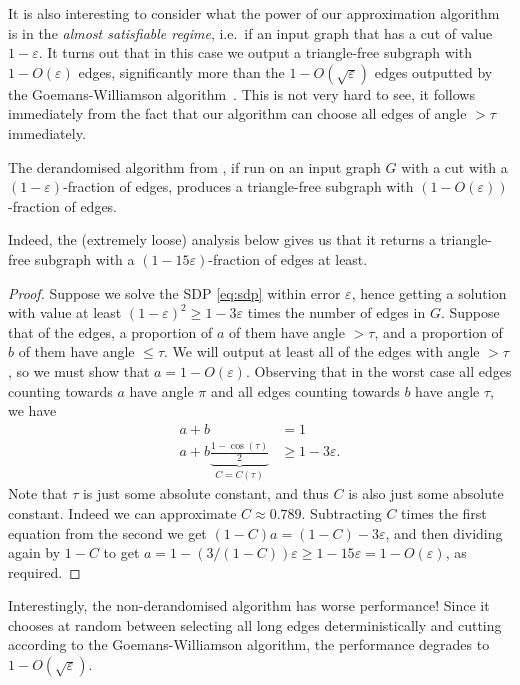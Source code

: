 \documentclass[a4paper,11pt, DIV=11]{scrartcl}
\renewcommand{\epsilon}{\varepsilon}
\theoremstyle{plain}
\theoremstyle{definition}
\begin{document}
It is also interesting to consider what the power of our approximation algorithm
is in the \emph{almost satisfiable regime}, i.e.~if an input graph that has a
cut of value $1 - \epsilon$. It turns out that in this case we output a
triangle-free subgraph with $1 - O(\epsilon)$ edges, significantly more than the
$1 - O(\sqrt{\epsilon})$ edges outputted by the Goemans-Williamson
algorithm~\cite{GW95}.
This is not very hard to see, it follows immediately from the fact that our algorithm can choose all edges of angle $> \tau$ immediately.

\begin{theorem}\label{thm:almost}
    The derandomised algorithm from , if run on an input graph $G$ with a cut with a  $(1 - \epsilon)$-fraction of edges, produces a triangle-free subgraph with $(1 - O(\epsilon))$-fraction of edges.
\end{theorem}
Indeed, the (extremely loose) analysis below gives us that it returns a triangle-free subgraph with a $(1 - 15\epsilon)$-fraction of edges at least.
\begin{proof}
    Suppose we solve the SDP \eqref{eq:sdp} within error $\epsilon$, hence getting a solution with value at least $(1 - \epsilon)^2 \geq 1 - 3\epsilon$ times the number of edges in $G$. Suppose that of the edges, a proportion of $a$ of them have angle $> \tau$, and a proportion of $b$ of them have angle $\leq \tau$. We will output at least all of the edges with angle $> \tau$, so we must show that $a = 1 - O(\epsilon)$. Observing that in the worst case all edges counting towards $a$ have angle $\pi$ and all edges counting towards $b$ have angle $\tau$, we have
    \begin{align*}
    a + b &= 1 \\
    a + b\underbrace{\frac{1 - \cos(\tau)}{2}}_{C = C(\tau)} &\geq 1 - 3\epsilon.
    \end{align*}
    Note that $\tau$ is just some absolute constant, and thus $C$ is also just some absolute constant. Indeed we can approximate $C \approx 0.789$. Subtracting $C$ times the first equation from the second we get $ (1 - C)a = (1 - C) - 3\epsilon$, and then dividing again by $1 - C$ to get $a = 1 - (3 / (1 - C)) \epsilon \geq 1 - 15 \epsilon = 1 - O(\epsilon)$, as required.
\end{proof}

Interestingly, the non-derandomised algorithm has worse performance! Since it chooses at random between selecting all long edges deterministically and cutting according to the Goemans-Williamson algorithm, the performance degrades to $1 - O(\sqrt{\epsilon})$.
\end{document}
